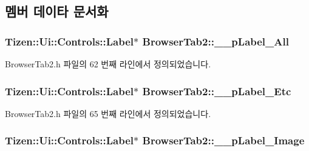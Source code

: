 \subsection{멤버 데이타 문서화}
\hypertarget{class_browser_tab2_ae52cf0e5fed4756ecf9d4f83a4676ef1}{
\subsubsection[{\+\_\+\+\_\+p\+Label\+\_\+\+All}]{\setlength{\rightskip}{0pt plus 5cm}Tizen\+::\+Ui\+::\+Controls\+::\+Label$\ast$ Browser\+Tab2\+::\+\_\+\+\_\+p\+Label\+\_\+\+All\hspace{0.3cm}{\ttfamily [private]}}}\label{class_browser_tab2_ae52cf0e5fed4756ecf9d4f83a4676ef1}


Browser\+Tab2.\+h 파일의 62 번째 라인에서 정의되었습니다.

\hypertarget{class_browser_tab2_a108831e016d3f9f353d885156029d1d4}{
\subsubsection[{\+\_\+\+\_\+p\+Label\+\_\+\+Etc}]{\setlength{\rightskip}{0pt plus 5cm}Tizen\+::\+Ui\+::\+Controls\+::\+Label$\ast$ Browser\+Tab2\+::\+\_\+\+\_\+p\+Label\+\_\+\+Etc\hspace{0.3cm}{\ttfamily [private]}}}\label{class_browser_tab2_a108831e016d3f9f353d885156029d1d4}


Browser\+Tab2.\+h 파일의 65 번째 라인에서 정의되었습니다.

\hypertarget{class_browser_tab2_abb8202996c81f3ac04d4ea2fd9f168a7}{
\subsubsection[{\+\_\+\+\_\+p\+Label\+\_\+\+Image}]{\setlength{\rightskip}{0pt plus 5cm}Tizen\+::\+Ui\+::\+Controls\+::\+Label$\ast$ Browser\+Tab2\+::\+\_\+\+\_\+p\+Label\+\_\+\+Image\hspace{0.3cm}{\ttfamily [private]}}}\label{class_browser_tab2_abb8202996c81f3ac04d4ea2fd9f168a7}


